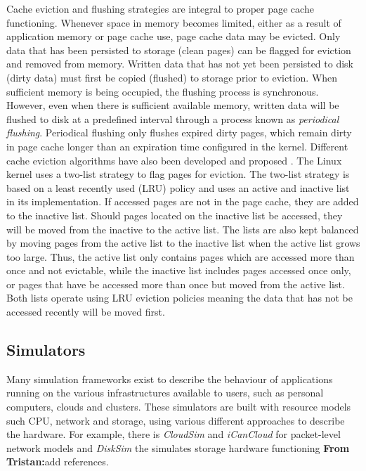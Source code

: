 \documentclass[conference]{IEEEtran}
\newcommand{\tristan}[1]{\color{orange}\textbf{From Tristan:}#1\color{black}}
\begin{document}
            Cache eviction and flushing strategies are integral to proper page cache functioning.
            Whenever space in memory becomes limited, either as a result of application memory
            or page cache use, page cache data may be evicted. Only data that 
            has been persisted to storage (clean pages) can be flagged for eviction and removed from
            memory. Written data that has not yet been persisted to disk (dirty data) must first
            be copied (flushed) to storage prior to eviction. When sufficient memory is
            being occupied, the flushing process is synchronous. However, even when 
            there is sufficient available memory, written data will be flushed to disk
            at a predefined interval through a process known as \textit{periodical flushing}.
            Periodical flushing only flushes expired dirty pages, which remain dirty in 
            page cache longer than an expiration time configured in the kernel. 
            Different cache eviction algorithms have also been developed and proposed
            \cite{owda2014comparison}.
            The Linux kernel uses a two-list strategy to flag pages for eviction.
            The two-list strategy is based on a least recently used (LRU) policy
            and uses an active and inactive list in its implementation.
            If accessed pages are not in the page cache, they are added to the inactive list. 
            Should pages located on the inactive list be accessed, they will be moved from 
            the inactive to the active list. 
            The lists are also kept balanced by moving pages from the active list
            to the inactive list when the active list grows too large.
            Thus, the active list only contains pages which are accessed more than once 
            and not evictable, while the inactive list includes pages accessed once only, 
            or pages that have be accessed more than once but moved from the active list. 
            Both lists operate using LRU eviction policies meaning the data that has
            not be accessed recently will be moved first.
             
        \subsection{Simulators}
            
            Many simulation frameworks exist to describe the behaviour of applications
            running on the various infrastructures available to users, such as personal computers,
            clouds and clusters.
            These simulators are built with resource models such CPU, network and 
            storage, using various different approaches to describe the hardware.
            For example, there is \textit{CloudSim} and \textit{iCanCloud} for packet-level network models 
            and \textit{DiskSim} the simulates storage hardware functioning \tristan{add references}.
\end{document}
